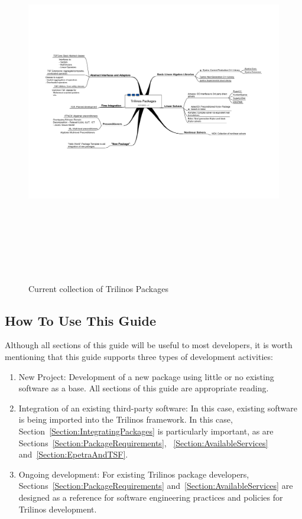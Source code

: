 \documentclass[12pt,relax]{TrilinosDevGuide}
\begin{document}
\begin{figure}
\includegraphics[height=6in,angle=270]{TrilinosPackagesDiagram}
\label{Figure:TrilinosPackages}
\caption{Current collection of Trilinos Packages}
\end{figure}

\subsection{How To Use This Guide}

Although all sections of this guide will be useful to most developers,
it is worth mentioning that 
this guide supports three types of development activities:
\begin{enumerate}
\item New Project: Development of a new package using little or no
existing software as a base.  All sections of this guide are
appropriate reading.
\item Integration of an existing third-party software: In this case,
existing software is being imported into the Trilinos framework.  In
this case, Section~\ref{Section:IntegratingPackages} is particularly
important, as are Sections~\ref{Section:PackageRequirements},
~\ref{Section:AvailableServices} and~\ref{Section:EpetraAndTSF}.
\item Ongoing development:  For existing Trilinos package developers,
Sections~\ref{Section:PackageRequirements}
and~\ref{Section:AvailableServices} are designed as a reference for
software engineering practices and policies for Trilinos development.
\end{enumerate}
\end{document}
